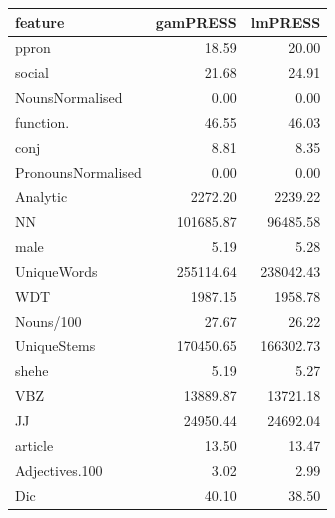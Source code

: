 \documentclass[12pt]{article}
\begin{document}
\begin{table}[H]
\centering
\begin{tabular}{lrr}
  \hline
feature & gamPRESS & lmPRESS \\ 
  \hline
ppron & 18.59 & 20.00 \\ 
  social & 21.68 & 24.91 \\ 
  NounsNormalised & 0.00 & 0.00 \\ 
  function. & 46.55 & 46.03 \\ 
  conj & 8.81 & 8.35 \\ 
  PronounsNormalised & 0.00 & 0.00 \\ 
  Analytic & 2272.20 & 2239.22 \\ 
  NN & 101685.87 & 96485.58 \\ 
  male & 5.19 & 5.28 \\ 
  UniqueWords & 255114.64 & 238042.43 \\ 
  WDT & 1987.15 & 1958.78 \\ 
  Nouns/100 & 27.67 & 26.22 \\ 
  UniqueStems & 170450.65 & 166302.73 \\ 
  shehe & 5.19 & 5.27 \\ 
  VBZ & 13889.87 & 13721.18 \\ 
  JJ & 24950.44 & 24692.04 \\ 
  article & 13.50 & 13.47 \\ 
  Adjectives.100 & 3.02 & 2.99 \\ 
  Dic & 40.10 & 38.50 \\ 
   \hline
\end{tabular}
\end{table}
\end{document}
